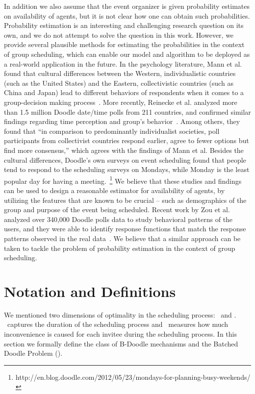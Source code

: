 In addition we also  assume that the event organizer is given probability estimates on availability of agents, but it is not clear how one can obtain such probabilities. 
 Probability estimation is an interesting and challenging research question on its own, and we do not attempt to solve the question in this work. However, we provide several plausible methods for estimating the probabilities in the context of group scheduling, which can enable our model and algorithm to be deployed as a real-world application in the future.
 In the psychology literature, Mann et al. found that cultural differences between the Western, individualistic countries (such as the United States) and the Eastern, collectivistic countries (such as China and Japan) lead to different behaviors of respondents when it comes to a group-decision making process~\cite{mann1998cross}.
 More recently, Reinecke et al. analyzed more than 1.5 million Doodle date/time polls from 211 countries, and confirmed similar findings regarding time perception and group's behavior~\cite{reinecke2013doodle}. Among others, they found that ``in comparison to predominantly individualist societies, poll participants from collectivist countries respond earlier, agree to fewer options but find more consensus,'' which agrees with the findings of Mann et al.
 Besides the cultural differences, Doodle's own surveys on event scheduling found that people tend to respond to the scheduling surveys on Mondays, while Monday is the least popular day for having a meeting.~\footnote{http://en.blog.doodle.com/2012/05/23/mondays-for-planning-busy-weekends/}
 We believe that these studies and findings can be used to design a reasonable estimator for availability of agents, by utilizing the features that are known to be crucial -- such as demographics of the group and purpose of the event being scheduled.
 Recent work by Zou et al. analyzed over 340,000 Doodle polls data to study behavioral patterns of the users, and they were able to identify response functions that match the response patterns observed in the real data~\cite{zou2015strategic}. We believe that a similar approach can be taken to tackle the problem of probability estimation in the context of group scheduling.


\section{Notation and Definitions}

We mentioned two dimensions of optimality in the scheduling process: \Time\ and \Inconvenience.
\Time\ captures the duration of the scheduling process and \Inconvenience\ measures how much inconvenience is caused for each invitee during the scheduling process.
In this section we formally define the class of B-Doodle mechanisms and the Batched Doodle Problem (\BDP).


